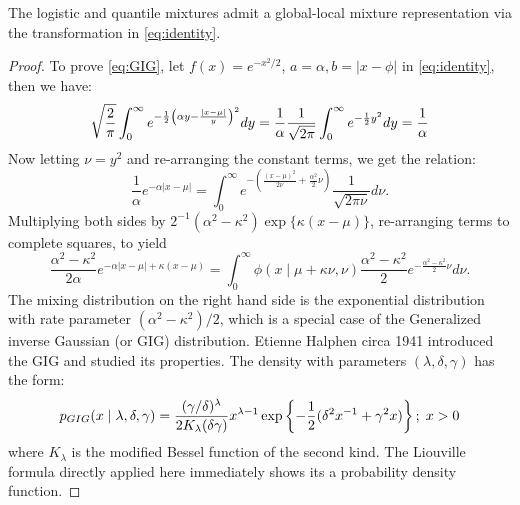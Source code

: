 \documentclass[letterpaper,11pt]{article}
\begin{document}
\begin{lemma}
The logistic and quantile mixtures admit a global-local mixture representation via the \CS transformation in \eqref{eq:identity}. 
\end{lemma}
\begin{proof}
To prove \eqref{eq:GIG}, let $f(x) = e^{-x^2/2}$, $a = \alpha, b = |x-\phi|$ in \eqref{eq:identity}, then we have: 
$$
\sqrt{\frac{2}{\pi}} \int_{0}^{\infty} e^{-\frac{1}{2} \left(\alpha y - \frac{|x-\mu|}{y} \right)^2} dy = \frac{1}{\alpha}\frac{1}{\sqrt{2\pi}} \int_0^{\infty} e^{-\frac{1}{2} y^2} dy = \frac{1}{\alpha}
$$
Now letting $\nu = y^2$ and re-arranging the constant terms, we get the relation:
$$
\frac{1}{\alpha} e^{-\alpha|x-\mu|} = \int_{0}^{\infty} e^{-\left( \frac{(x-\mu)^2}{2\nu} + \frac{\alpha^2}{2} \nu \right)} \frac{1}{\sqrt{2\pi\nu}} d\nu.
$$
Multiplying both sides by $2^{-1}(\alpha^2-\kappa^2) \exp\{\kappa(x-\mu)\}$, re-arranging terms to complete squares, to yield 
\begin{equation*}
  \frac{\alpha^2-\kappa^2}{2\alpha} e^{-\alpha|x-\mu| + \kappa(x-\mu)} = \int_0^{\infty} \phi(x \mid \mu + \kappa \nu, \nu) \frac{\alpha^2-\kappa^2}{2} e^{-\frac{\alpha^2-\kappa^2}{2} \nu} d \nu. 
\end{equation*}
The mixing distribution on the right hand side is the exponential distribution with rate parameter $(\alpha^2-\kappa^2)/2$, which is a special case of the Generalized inverse Gaussian (or GIG) distribution. Etienne Halphen circa 1941 \citep{seshadri1997halphen} introduced the GIG and \citet{barndorff1977infinite} studied its properties. The density with parameters $(\lambda, \delta, \gamma)$ has the form: 
$$
p_{GIG}(x \mid \lambda, \delta, \gamma) = \frac{(\gamma/\delta)^{\lambda}}{2K_{\lambda}(\delta \gamma)} x^{\lambda-1} \exp \left\{ -\frac{1}{2} (\delta^2 x^{-1} + 
\gamma^2 x )  \right\}; \; x > 0
$$
where $K_{\lambda}$ is the modified Bessel function of the second kind. The Liouville formula directly applied here immediately shows its a probability density function. 


\end{proof}
\end{document}
